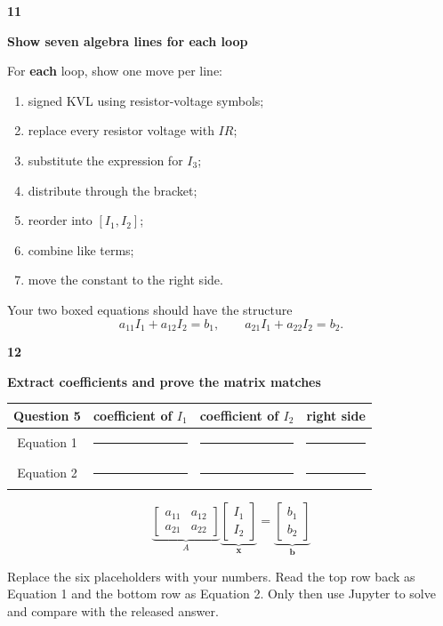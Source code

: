 \documentclass[10pt,letterpaper]{article}
\newcommand{\steptitle}[2]{%
  \noindent\colorbox{TEJBlue}{\parbox{0.075\linewidth}{\centering\color{white}\Large\bfseries #1}}%
  \hspace{0.012\linewidth}%
  \colorbox{TEJPale}{\parbox{0.875\linewidth}{\color{TEJNavy}\large\bfseries #2}}\par\vspace{5pt}
}
\begin{document}
\steptitle{11}{Show seven algebra lines for each loop}

For \textbf{each} loop, show one move per line:
\begin{enumerate}
  \item signed KVL using resistor-voltage symbols;
  \item replace every resistor voltage with $IR$;
  \item substitute the expression for $I_3$;
  \item distribute through the bracket;
  \item reorder into $[I_1,I_2]$;
  \item combine like terms;
  \item move the constant to the right side.
\end{enumerate}

Your two boxed equations should have the structure
\[
\boxed{a_{11}I_1+a_{12}I_2=b_1},
\qquad
\boxed{a_{21}I_1+a_{22}I_2=b_2}.
\]

\steptitle{12}{Extract coefficients and prove the matrix matches}

\begin{center}
\begin{tabular}{c c c c}
\toprule
Question 5 & coefficient of $I_1$ & coefficient of $I_2$ & right side \\
\midrule
Equation 1 & \rule{0.75in}{0.4pt} & \rule{0.75in}{0.4pt} & \rule{0.75in}{0.4pt} \\
Equation 2 & \rule{0.75in}{0.4pt} & \rule{0.75in}{0.4pt} & \rule{0.75in}{0.4pt} \\
\bottomrule
\end{tabular}
\end{center}

\[
\underbrace{\begin{bmatrix}a_{11}&a_{12}\\a_{21}&a_{22}\end{bmatrix}}_{A}
\underbrace{\begin{bmatrix}I_1\\I_2\end{bmatrix}}_{\mathbf{x}}
=
\underbrace{\begin{bmatrix}b_1\\b_2\end{bmatrix}}_{\mathbf{b}}
\]

Replace the six placeholders with your numbers. Read the top row back as Equation 1 and the bottom row as Equation 2. Only then use Jupyter to solve and compare with the released answer.
\end{document}
